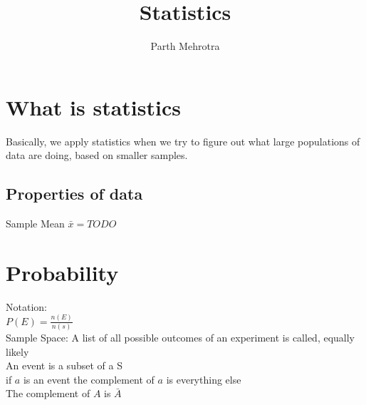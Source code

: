 \documentclass{article}
\title{Statistics}
\author{Parth Mehrotra}
\begin{document}
	\maketitle
	\newpage

	\section{What is statistics} 
		Basically, we apply statistics when we try to figure out what large populations of data are doing, based on smaller samples.
		\subsection{Properties of data}
			Sample Mean
			$\bar{x} = TODO $

	\section{Probability}
		Notation: \\
		$P(E)=\frac{n(E)}{n(s)}$ \\
		Sample Space: A list of all possible outcomes of an experiment is called, equally likely \\
		An event is a subset of a S \\
		if $a$ is an event the complement of $a$ is everything else \\
		The complement of $A$ is $\bar{A}$ \\
\end{document}
